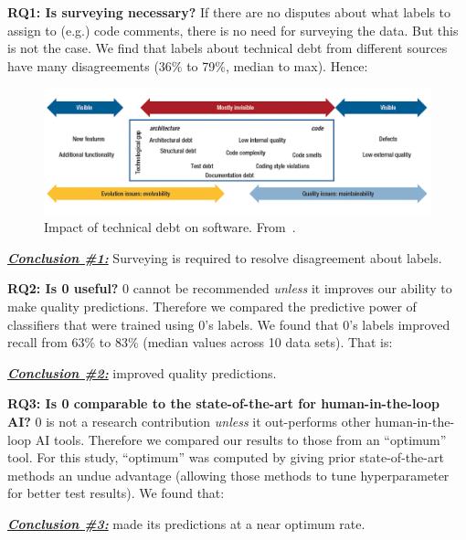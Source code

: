 \documentclass[10pt,conference]{IEEEtran}
\newenvironment{result}[2]
{\begin{myshadowbox}\textbf{\textit{\underline{Conclusion \##1:}}} #2}{ 
\end{myshadowbox}}
\begin{document}
 
{\bf RQ1: Is surveying necessary?} 
If there are no disputes about what labels to assign to (e.g.) code comments,  there is no need for  surveying the data. But this is not the case. 
We find that labels  about technical debt from different sources
have many disagreements (36\% to 79\%, median to max).
Hence: 


\begin{figure}[!b]

\begin{center}
\includegraphics[width=6in]{debt.png}
\end{center}
\caption{Impact of technical debt on software. From~\cite{Ozkaya12}.}\label{fig:impact}
\end{figure} 
\begin{result}{1}
Surveying is required to resolve
 disagreement about labels.
 \end{result}
 
{\bf RQ2: Is {\IT}0 useful?}  {\IT}0 cannot be recommended {\em unless} it
improves our ability to make quality predictions. 
Therefore we compared the predictive power of classifiers  that were
trained using {\IT}0's labels. We found that
{\IT}0's labels improved recall from 63\% to 83\% (median values across 10 data sets).
That is:
\begin{result}{2}
{\IT}0 improved quality predictions. 
\end{result}

 
{\bf RQ3: Is  {\IT}0 comparable to the state-of-the-art for human-in-the-loop AI?}
{\IT}0 is not  a research contribution {\em unless} it out-performs
other human-in-the-loop AI tools.
Therefore we compared our results to those
from an ``optimum'' tool.
For this study,  ``optimum'' was computed
by giving prior state-of-the-art   methods   an undue advantage
(allowing those methods to  
tune hyperparameter for better test results).
We found that:
\begin{result}{3}
{\IT}0 made its predictions
at a near optimum rate.
\end{result}
\end{document}
